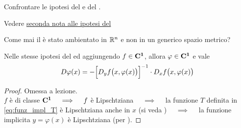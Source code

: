 \begin{exercise}
	Confrontare le ipotesi del  e del .
	\begin{solution}
		Vedere \hyperlink{note:teo_funz_impl_note_ipot1}{seconda nota alle ipotesi del }
	\end{solution}
\end{exercise}
\begin{exercise}
	Come mai il  è stato ambientato in $\mathbb{R}^n$ e non in un generico spazio metrico?
\end{exercise}
\begin{theorem}
	\label{teo:diff_primo_funz_impl}
	Nelle stesse ipotesi del  ed aggiungendo $f \in \mathbf{C^{1}}$, allora $\varphi \in \mathbf{C^{1}}$ e vale
	\begin{equation}
		\label{eq:diff_primo_funz_impl}
		D\varphi(x) = - \Bigl[ D_yf \bigl( x, \varphi(x) \bigr) \Bigr]^{-1} \cdot D_xf \bigl( x, \varphi(x) \bigr)
	\end{equation}
	\begin{proof}
		Omessa a lezione.\\
		\cbstart
		$f$ è di classe $\mathbf{C^{1}} \quad \implies \quad f$ è Lipschtziana $\quad \implies \quad$ la funzione $T$ definita in \cref{eq:funz_impl_T} è Lipschtziana anche in $x$ (si veda ) $\quad \implies \quad$ la funzione implicita $y = \varphi(x)$ è Lipschtziana (per ).


\end{proof}
\end{theorem}
